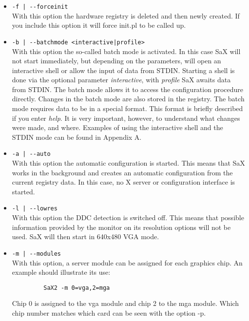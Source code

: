 \begin{itemize}
\item \verb+-f | --forceinit+\\
      With this option the hardware registry is deleted and then newly
      created. If you include this option it will force init.pl to be called
      up. 

\item \verb+-b | --batchmode <interactive|profile>+\\
      With this option the so-called batch mode is activated.
      In this case SaX will not start immediately, but depending on the
      parameters, will open an interactive shell or allow the input of data
      from STDIN. Starting a shell is done via the optional parameter 
      \textit{interactive}, with \textit{profile} SaX awaits data from STDIN. 
      The batch mode allows it to access the configuration procedure directly. 
      Changes in the batch mode are also stored in the registry.
      The batch mode requires data to be in a special format. This format is
      briefly described if you enter \textit{help}. It is very important,
      however, to understand what changes were made, and where. Examples of
      using the interactive shell and the STDIN mode can be found in Appendix
      A. 
      
\item \verb+-a | --auto+\\
      With this option the automatic configuration is started. This means that
      SaX works in the background and creates an automatic configuration from
      the current registry data. In this case, no X server or  
      configuration interface is started. 

\item \verb+-l | --lowres+\\
      With this option the DDC detection is switched off. This means that
      possible information provided by the monitor on its resolution options
      will not be used. 
      SaX will then start in 640x480 VGA mode.

\item \verb+-m | --modules+\\
      With this option, a server module can be assigned for each graphics
      chip. An example should illustrate its use:
      \begin{verbatim}
         SaX2 -m 0=vga,2=mga 
      \end{verbatim}
      Chip 0 is assigned to the vga module and chip 2 to the mga module. Which
      chip number matches which card can be seen with the option -p. 
      

\end{itemize}

